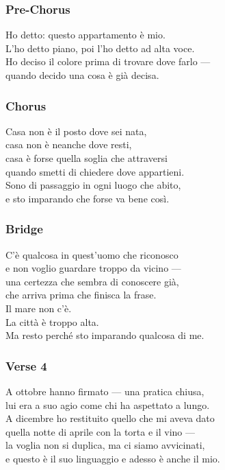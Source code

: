 \subsubsection{Pre-Chorus}\label{pre-chorus-24}

Ho detto: questo appartamento è mio.\\
L'ho detto piano, poi l'ho detto ad alta voce.\\
Ho deciso il colore prima di trovare dove farlo ---\\
quando decido una cosa è già decisa.

\subsubsection{Chorus}\label{chorus-34}

Casa non è il posto dove sei nata,\\
casa non è neanche dove resti,\\
casa è forse quella soglia che attraversi\\
quando smetti di chiedere dove appartieni.\\
Sono di passaggio in ogni luogo che abito,\\
e sto imparando che forse va bene così.

\subsubsection{Bridge}\label{bridge-10}

C'è qualcosa in quest'uomo che riconosco\\
e non voglio guardare troppo da vicino ---\\
una certezza che sembra di conoscere già,\\
che arriva prima che finisca la frase.\\
Il mare non c'è.\\
La città è troppo alta.\\
Ma resto perché sto imparando qualcosa di me.

\subsubsection{Verse 4}\label{verse-4-6}

A ottobre hanno firmato --- una pratica chiusa,\\
lui era a suo agio come chi ha aspettato a lungo.\\
A dicembre ho restituito quello che mi aveva dato\\
quella notte di aprile con la torta e il vino ---\\
la voglia non si duplica, ma ci siamo avvicinati,\\
e questo è il suo linguaggio e adesso è anche il mio.

